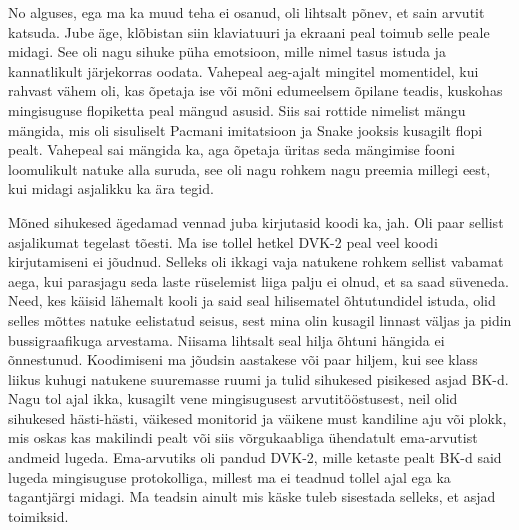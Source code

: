 
No alguses, ega ma ka muud teha ei osanud, oli lihtsalt põnev, et sain arvutit 
katsuda. Jube äge, klõbistan siin klaviatuuri ja ekraani peal toimub selle 
peale midagi. See oli nagu sihuke püha emotsioon, mille nimel 
tasus istuda ja kannatlikult järjekorras oodata. Vahepeal aeg-ajalt 
mingitel momentidel, kui  rahvast vähem oli, kas õpetaja ise või mõni 
edumeelsem õpilane teadis, kuskohas mingisuguse flopiketta peal  mängud asusid. 
Siis sai rottide nimelist mängu mängida, mis oli sisuliselt 
Pacmani imitatsioon ja Snake jooksis 
kusagilt flopi pealt. Vahepeal sai mängida ka, aga õpetaja üritas seda 
mängimise fooni loomulikult natuke alla suruda, see oli nagu rohkem nagu 
preemia millegi eest, kui midagi asjalikku ka ära tegid. 


Mõned sihukesed ägedamad vennad juba kirjutasid koodi ka, jah. Oli  paar 
sellist asjalikumat tegelast tõesti. Ma ise tollel hetkel DVK-2 peal veel koodi 
kirjutamiseni ei jõudnud. Selleks oli ikkagi vaja 
natukene rohkem sellist vabamat aega,  kui parasjagu seda laste rüselemist 
liiga palju ei olnud, et sa saad  süveneda. Need, kes käisid 
lähemalt kooli ja said seal hilisematel õhtutundidel istuda, olid 
selles mõttes natuke eelistatud seisus, sest mina olin kusagil linnast väljas 
ja pidin bussigraafikuga arvestama.  Niisama lihtsalt seal hilja õhtuni hängida 
ei õnnestunud. Koodimiseni ma jõudsin aastakese või paar hiljem, kui see klass 
liikus kuhugi natukene suuremasse ruumi ja tulid sihukesed pisikesed asjad 
BK-d. Nagu tol ajal ikka, kusagilt vene mingisugusest 
arvutitööstusest, neil olid sihukesed  hästi-hästi, väikesed monitorid ja  väikene 
must kandiline  aju või plokk, mis oskas kas  makilindi pealt 
või siis võrgukaabliga ühendatult ema-arvutist andmeid lugeda. Ema-arvutiks oli pandud DVK-2, mille 
ketaste pealt BK-d said  lugeda mingisuguse protokolliga, 
millest ma ei teadnud tollel ajal ega ka tagantjärgi midagi. Ma teadsin ainult 
mis käske tuleb sisestada  selleks, et asjad toimiksid.

